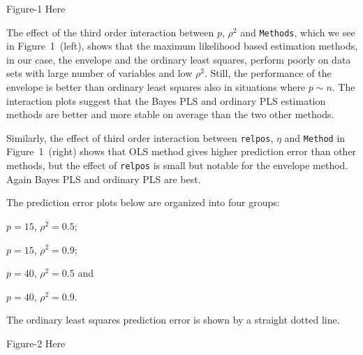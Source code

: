 \documentclass[a4paper, 11pt]{article}
\begin{document}
\begin{center}
 Figure-1 Here 
\end{center}

The effect of the third order interaction between $p$, $\rho^2$ and {\tt Methods}, which we see in Figure~1~(left), shows that the maximum likelihood based estimation methods, in our case, the envelope and the ordinary least squares, perform poorly on data sets with large number of variables and low $\rho^2$. Still, the performance of the envelope is better than ordinary least squares also in situations where $p\sim n$. The interaction plots suggest that the Bayes PLS and ordinary PLS estimation methods are better and more stable on average than the two other methods.

Similarly, the effect of third order interaction between {\tt relpos}, $\eta$ and {\tt Method} in Figure~1~(right) shows that OLS method gives higher prediction error than other methods, but the effect of {\tt relpos} is small but notable for the envelope method. Again Bayes PLS and ordinary PLS are best.

The prediction error plots below are organized into four groups:
\begin{enumerate*}[label = \alph*)]
\item \label{lst:g1} $p = 15$, $\rho^2 = 0.5$;
\item \label{lst:g2} $p = 15$, $\rho^2 = 0.9$;
\item \label{lst:g3} $p = 40$, $\rho^2 = 0.5$ and
\item \label{lst:g4} $p = 40$, $\rho^2 = 0.9$.
\end{enumerate*}
  The ordinary least squares prediction error is shown by a straight dotted line.

\begin{center}
  Figure-2 Here
\end{center}

\end{document}
